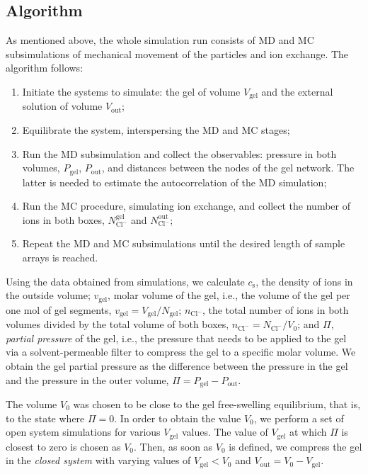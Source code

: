 \documentclass[gels,article,accept,pdftex,moreauthors]{Definitions/mdpi}
\newcommand{\ie}{{i.e.,} }
\newcommand{\ncl}{n_\mathrm{Cl^-}}
\newcommand{\Ncl}{N_\mathrm{Cl^-}}
\newcommand{\gel}{^\mathrm{gel}}
\newcommand{\out}{^{\mathrm{out}}}
\newcommand{\cs}{c_{\mathrm{s}}}
\newcommand{\Vgel}{V_\mathrm{gel}}
\newcommand{\vgel}{v_\mathrm{gel}}
\newcommand{\Ngel}{N_\mathrm{gel}}
\newcommand{\Pgel}{\Pi}
\newcommand{\Pout}{P_\mathrm{out}}
\newcommand{\Vout}{V_\mathrm{out}}
\newcommand{\Vbox}{V_0}
\begin{document}
\subsection{Algorithm}
As mentioned above, the whole simulation run consists of MD and MC subsimulations of mechanical movement of the particles and ion exchange. The algorithm follows:
\begin{enumerate}
\item Initiate the systems to simulate: the gel of volume $\Vgel$ and the external solution of volume $\Vout$;
\item Equilibrate the system, interspersing the MD and MC stages;
\item Run the MD subsimulation and collect the observables: pressure in both volumes, $P_\mathrm{gel}$, $P_\mathrm{out}$, and distances between the nodes of the gel network. The latter is needed to estimate the autocorrelation of the MD simulation;
\item Run the MC procedure, simulating ion exchange, and collect the number of ions in both boxes, 
$\Ncl\gel$ and $\Ncl\out$; 
\item Repeat the MD and MC subsimulations until the desired length of sample arrays is reached.
\end{enumerate}


Using the data obtained from simulations, we calculate  
$\cs$, the density of ions in  the outside volume;
$\vgel$, molar volume of the gel, \ie the volume of the gel per one mol of gel segments, $\vgel = \Vgel / \Ngel$;
$\ncl$, the total number of ions in both volumes divided by the total volume of both boxes, $\ncl = \Ncl/\Vbox$; and
$\Pgel$, \emph{partial pressure} of the gel, \ie the pressure that needs to be applied to the gel via a solvent-permeable filter to compress the gel to a specific molar volume.
We obtain the gel partial pressure as the difference between the pressure in the gel and the pressure in the outer volume, $\Pgel=P_\mathrm{gel} - \Pout$.



The volume $\Vbox$ was chosen to be close to the gel free-swelling equilibrium, that is, to the state where $\Pgel = 0$.
In order to obtain the value $\Vbox$, we perform a set of open system simulations for various $\Vgel$ values.
The value of $\Vgel$ at which $\Pgel$ is closest to zero is chosen as $\Vbox$.
Then, as soon as $\Vbox$ is defined, we compress the gel in the \emph{closed system} with varying values of $\Vgel<\Vbox$ and $\Vout= \Vbox - \Vgel$.
\end{document}
